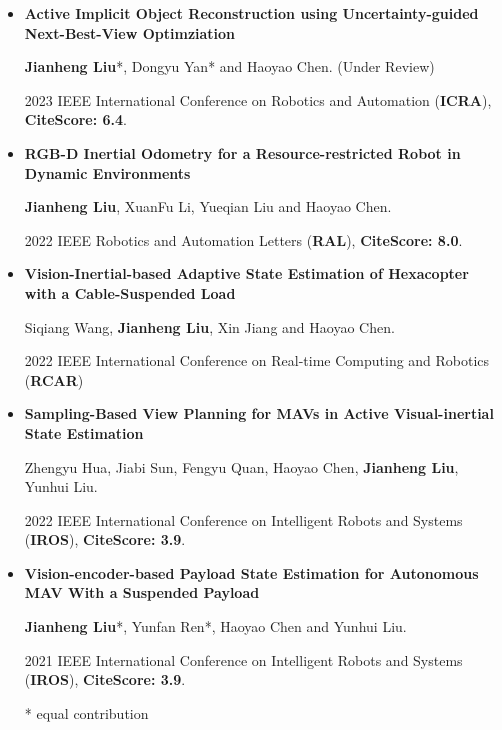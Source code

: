 \documentclass[11pt,a4paper,sans]{moderncv}        %
\begin{document}
\begin{itemize}

    \item{\textbf{Active Implicit Object Reconstruction using Uncertainty-guided Next-Best-View Optimziation}

    \small{\textbf{Jianheng Liu}*, Dongyu Yan* and Haoyao Chen. (Under Review)}

    2023 IEEE International Conference on Robotics and Automation (\textbf{ICRA}), \textbf{CiteScore: 6.4}.
    }
    
    \vspace{3pt}

    \item{\textbf{RGB-D Inertial Odometry for a Resource-restricted Robot in Dynamic Environments}

    \small{\textbf{Jianheng Liu}, XuanFu Li, Yueqian Liu and Haoyao Chen.}
    
    2022 IEEE Robotics and Automation Letters (\textbf{RAL}), \textbf{CiteScore: 8.0}.
    }
    
    \vspace{3pt}

    \item{\textbf{Vision-Inertial-based Adaptive State Estimation of Hexacopter with a Cable-Suspended Load}

    \small{Siqiang Wang, \textbf{Jianheng Liu}, Xin Jiang and Haoyao Chen.
    }

    2022 IEEE International Conference on Real-time Computing and Robotics (\textbf{RCAR})
    }
    \vspace{3pt}



\item{\textbf{Sampling-Based View Planning for MAVs in Active Visual-inertial State Estimation}

\small{Zhengyu Hua, Jiabi Sun, Fengyu Quan, Haoyao Chen, \textbf{Jianheng Liu}, Yunhui Liu.}

2022 IEEE International Conference on Intelligent Robots and Systems (\textbf{IROS}), \textbf{CiteScore: 3.9}.
}

\vspace{3pt}

\item{\textbf{Vision-encoder-based Payload State Estimation for Autonomous MAV With a Suspended Payload}

\small{\textbf{Jianheng Liu}*, Yunfan Ren*, Haoyao Chen and Yunhui Liu. }

2021 IEEE International Conference on Intelligent Robots and Systems (\textbf{IROS}), \textbf{CiteScore: 3.9}.
}


\footnotesize{* equal contribution}
\end{itemize}
\end{document}
